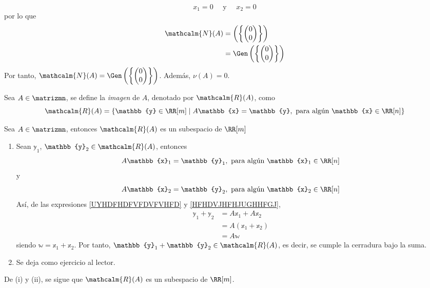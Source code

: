 \begin{examplebox}{}{}
    $$x_1 = 0 \quad \text{ y } \quad x_2 = 0$$
    por lo que
    \begin{align*}
        \mathcalm{N}(A) & = \left( \left\{ \begin{pmatrix}
            0 \\
            0
        \end{pmatrix} \right\} \right) \\
        & = \Gen \left( \left\{ \begin{pmatrix}
            0 \\
            0
        \end{pmatrix} \right\} \right)
    \end{align*}
    Por tanto, $\mathcalm{N}(A) = \Gen \left( \left\{ \begin{pmatrix}
        0 \\
        0
    \end{pmatrix} \right\} \right)$. Además, $\nu(A) = 0$.
\end{examplebox}

\begin{definicion}{}{}
    Sea $A \in \matrizmn$, se define la \emph{imagen} de $A$, denotado por $\mathcalm{R}(A)$, como
    $$\mathcalm{R}(A) = \left\{ \mathbb{y} \in \RR[m] \mid A\mathbb{x} = \mathbb{y}, \text{ para algún } \mathbb{x} \in \RR[n] \right\}$$
\end{definicion}

\begin{theorem}{}{}
    Sea $A \in \matrizmn$, entonces $\mathcalm{R}(A)$ es un subespacio de $\RR[m]$

    \tcblower
    \demostracion
    \begin{enumerate}[label=\roman*), topsep=6pt, itemsep=0pt]
        \item Sean $\mathbb{y}_1$, $\mathbb{y}_2 \in \mathcalm{R}(A)$, entonces
        \begin{equation}
            A\mathbb{x}_1 = \mathbb{y}_1, \text{ para algún } \mathbb{x}_1 \in \RR[n] \label{UYHDFHDFVFDVFVHFD}
        \end{equation}
        y
        \begin{equation}
            A\mathbb{x}_2 = \mathbb{y}_2, \text{ para algún } \mathbb{x}_2 \in \RR[n] \label{HFHDVJHFHJUGHHFGJ}
        \end{equation}
        Así, de las expresiones \eqref{UYHDFHDFVFDVFVHFD} y \eqref{HFHDVJHFHJUGHHFGJ},
        \begin{align*}
            \mathbb{y}_1 + \mathbb{y}_2 & = A\mathbb{x}_1 + A\mathbb{x}_2 \\
            & = A(\mathbb{x}_1 + \mathbb{x}_2) \\
            & = A\mathbb{w}
        \end{align*}
        siendo $\mathbb{w} = \mathbb{x}_1 + \mathbb{x}_2$. Por tanto, $\mathbb{y}_1 + \mathbb{y}_2 \in \mathcalm{R}(A)$, es decir, se cumple la cerradura bajo la suma.
        \item Se deja como ejercicio al lector.
    \end{enumerate}
    De (i) y (ii), se sigue que $\mathcalm{R}(A)$ es un subespacio de $\RR[m]$.
\end{theorem}

